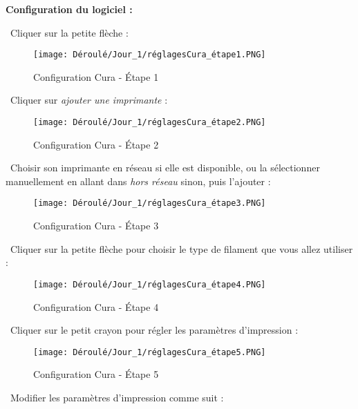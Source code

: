 \begin{flushleft}
\textbf{Configuration du logiciel :}\vspace{0.4cm}

\textbullet \, Cliquer sur la petite flèche :
\begin{figure}[!h]
    \centering
    \texttt{[image: Déroulé/Jour\_1/réglagesCura\_étape1.PNG]}
    \caption{Configuration Cura - \'Etape 1}
    \label{fig:my_label}
\end{figure}

\newpage

\textbullet \, Cliquer sur \textit{ajouter une imprimante} :
\begin{figure}[!h]
    \centering
    \texttt{[image: Déroulé/Jour\_1/réglagesCura\_étape2.PNG]}
    \caption[\'Etape 2]{Configuration Cura - \'Etape 2}
    \label{fig:my_label}
\end{figure}

\textbullet \, Choisir son imprimante en réseau si elle est disponible, ou la sélectionner manuellement en allant dans \textit{hors réseau} sinon, puis l'ajouter :
\begin{figure}[!h]
    \centering
    \texttt{[image: Déroulé/Jour\_1/réglagesCura\_étape3.PNG]}
    \caption[\'Etape 3]{Configuration Cura - \'Etape 3}
    \label{fig:my_label}
\end{figure}

\newpage

\textbullet \, Cliquer sur la petite flèche pour choisir le type de filament que vous allez utiliser :
\begin{figure}[!h]
    \centering
    \texttt{[image: Déroulé/Jour\_1/réglagesCura\_étape4.PNG]}
    \caption[\'Etape 4]{Configuration Cura - \'Etape 4}
    \label{fig:my_label}
\end{figure}

\textbullet \, Cliquer sur le petit crayon pour régler les paramètres d'impression :
\begin{figure}[!h]
    \centering
    \texttt{[image: Déroulé/Jour\_1/réglagesCura\_étape5.PNG]}
    \caption[\'Etape 5]{Configuration Cura - \'Etape 5}
    \label{fig:my_label}
\end{figure}

\textbullet \, Modifier les paramètres d'impression comme suit :\\
\begin{figure}[!h]
    \centering
    \begin{tabular}{|l|l|l|}
    

\end{tabular}
\end{figure}
\end{flushleft}
